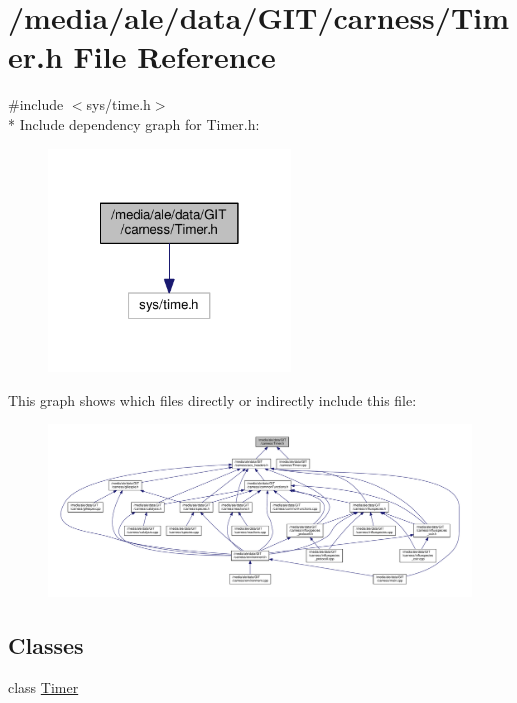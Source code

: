 \hypertarget{a00047}{\section{/media/ale/data/\-G\-I\-T/carness/\-Timer.h File Reference}
\label{a00047}
}
{\ttfamily \#include $<$sys/time.\-h$>$}\\*
Include dependency graph for Timer.\-h\-:\nopagebreak
\begin{figure}[H]
\begin{center}
\leavevmode
\includegraphics[width=182pt]{a00083}
\end{center}
\end{figure}
This graph shows which files directly or indirectly include this file\-:\nopagebreak
\begin{figure}[H]
\begin{center}
\leavevmode
\includegraphics[width=350pt]{a00084}
\end{center}
\end{figure}
\subsection*{Classes}
\begin{DoxyCompactItemize}
\item 
class \hyperlink{a00023}{Timer}
\end{DoxyCompactItemize}
